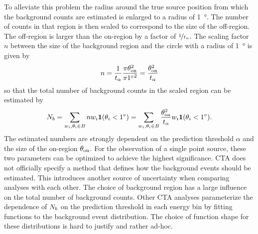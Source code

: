 To alleviate this problem the radius around the true source position from which the background counts are estimated is 
enlarged to a radius of \SI{1}{\degree}. The number of counts in that region is then scaled to correspond to the size of the off-region. 
The off-region is larger than the on-region by a factor of $\nicefrac{1}{t_{\alpha}}$. The scaling factor $n$ between the size of the background region 
and the circle with a radius of \SI{1}{\degree} is given by
\begin{equation*}
    n = \frac{1}{t_{\alpha}} \frac{\pi \theta_{\text{on}}^2}{\pi \SI{1}{\degree}^2} = \frac{\theta_{\text{on}}^2}{t_{\alpha}}
\end{equation*}
so that the total number of background counts in the scaled region can be estimated by 
\begin{equation}
    \label{eq:nbkg}
    N_{b} = \sum_{w_i, \theta_i \in B} n w_i \mathbf{1}(\theta_i < \SI{1}{\degree}) = \sum_{w_i, \theta_i \in B} \frac{\theta_{\text{on}}^2}{t_{\alpha}} w_i \mathbf{1}(\theta_i < \SI{1}{\degree}).
\end{equation}
The estimated numbers are strongly dependent on the prediction threshold $\alpha$ and the size of the on-region $\theta_{\text{on}}$.
For the observation of a single point source, these two parameters can be optimized to achieve the highest \lima significance.
CTA does not officially specify a method that defines how the background events should be estimated. 
This introduces another source of uncertainty when comparing analyses with each other. The choice of background region has a large influence on 
the total number of background counts. Other CTA analyses parameterize the dependence of $N_{b}$ on the prediction threshold in each energy bin by fitting 
functions to the background event distribution. The choice of function shape for these distributions is hard to justify and rather ad-hoc.


